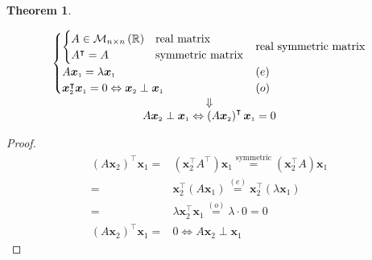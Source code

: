 \documentclass[
]{book}
\newtheorem{theorem}{Theorem}[chapter]
\theoremstyle{definition}
\theoremstyle{definition}
\theoremstyle{definition}
\theoremstyle{definition}
\theoremstyle{remark}
\begin{document}
\begin{theorem}
\protect\hypertarget{thm:unnamed-chunk-7}{}\label{thm:unnamed-chunk-7}\leavevmode

\[
\begin{array}{c}
\begin{cases}
\begin{cases}
A\in\mathcal{M}_{n\times n}\left(\mathbb{R}\right) & \textup{real matrix}\\
A^{\intercal}=A & \textup{symmetric matrix}
\end{cases} & \textup{real symmetric matrix}\\
A\boldsymbol{x}_{{\scriptscriptstyle 1}}=\lambda\boldsymbol{x}_{{\scriptscriptstyle 1}} & \left(e\right)\\
\boldsymbol{x}_{{\scriptscriptstyle 2}}^{\intercal}\boldsymbol{x}_{{\scriptscriptstyle 1}}=0\Leftrightarrow\boldsymbol{x}_{{\scriptscriptstyle 2}}\perp\boldsymbol{x}_{{\scriptscriptstyle 1}} & \left(o\right)
\end{cases}\\
\Downarrow\\
A\boldsymbol{x}_{{\scriptscriptstyle 2}}\perp\boldsymbol{x}_{{\scriptscriptstyle 1}}\Leftrightarrow\left(A\boldsymbol{x}_{{\scriptscriptstyle 2}}\right)^{\intercal}\boldsymbol{x}_{{\scriptscriptstyle 1}}=0
\end{array}
\]

\end{theorem}

\begin{proof}
\[
\begin{aligned}
\left(A\boldsymbol{x}_{{\scriptscriptstyle 2}}\right)^{\intercal}\boldsymbol{x}_{{\scriptscriptstyle 1}}= & \left(\boldsymbol{x}_{{\scriptscriptstyle 2}}^{\intercal}A^{\intercal}\right)\boldsymbol{x}_{{\scriptscriptstyle 1}}\overset{\text{symmetric}}{=}\left(\boldsymbol{x}_{{\scriptscriptstyle 2}}^{\intercal}A\right)\boldsymbol{x}_{{\scriptscriptstyle 1}}\\
= & \boldsymbol{x}_{{\scriptscriptstyle 2}}^{\intercal}\left(A\boldsymbol{x}_{{\scriptscriptstyle 1}}\right)\overset{\left(e\right)}{=}\boldsymbol{x}_{{\scriptscriptstyle 2}}^{\intercal}\left(\lambda\boldsymbol{x}_{{\scriptscriptstyle 1}}\right)\\
= & \lambda\boldsymbol{x}_{{\scriptscriptstyle 2}}^{\intercal}\boldsymbol{x}_{{\scriptscriptstyle 1}}\overset{\left(o\right)}{=}\lambda\cdot0=0\\
\left(A\boldsymbol{x}_{{\scriptscriptstyle 2}}\right)^{\intercal}\boldsymbol{x}_{{\scriptscriptstyle 1}}= & 0\Leftrightarrow A\boldsymbol{x}_{{\scriptscriptstyle 2}}\perp\boldsymbol{x}_{{\scriptscriptstyle 1}}
\end{aligned}
\]
\end{proof}
\end{document}
